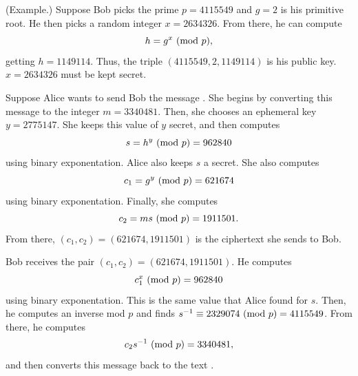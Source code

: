 \documentclass[letterpaper]{article}
\begin{document}
\begin{mdframed}
    (Example.) Suppose Bob picks the prime $p = 4115549$ and $g = 2$ is his primitive root. He then picks a random integer $x = 2634326$. From there, he can compute \[h = g^x \ (\mathrm{mod}\ p),\] getting $h = 1149114$. Thus, the triple $(4115549, 2, 1149114)$ is his public key. $x = 2634326$ must be kept secret. 

    \bigskip 

    Suppose Alice wants to send Bob the message . She begins by converting this message to the integer $m = 3340481$. Then, she chooses an ephemeral key $y = 2775147$. She keeps this value of $y$ secret, and then computes \[s = h^y \ (\mathrm{mod}\ p) = 962840\] using binary exponentation. Alice also keeps $s$ a secret. She also computes \[c_1 = g^y \ (\mathrm{mod}\ p) = 621674\] using binary exponentation. Finally, she computes \[c_2 = ms \ (\mathrm{mod}\ p) = 1911501.\] From there, $(c_1, c_2) = (621674, 1911501)$ is the ciphertext she sends to Bob.

    \bigskip 

    Bob receives the pair $(c_1, c_2) = (621674, 1911501)$. He computes 
    \[c_1^x \ (\mathrm{mod}\ p) = 962840\]
    using binary exponentation. This is the same value that Alice found for $s$. Then, he computes an inverse mod $p$ and finds $s^{-1} \equiv 2329074 \ (\mathrm{mod}\ p) = 4115549$. From there, he computes \[c_2 s^{-1} \ (\mathrm{mod}\ p) = 3340481,\] and then converts this message back to the text . 
\end{mdframed}
\end{document}
